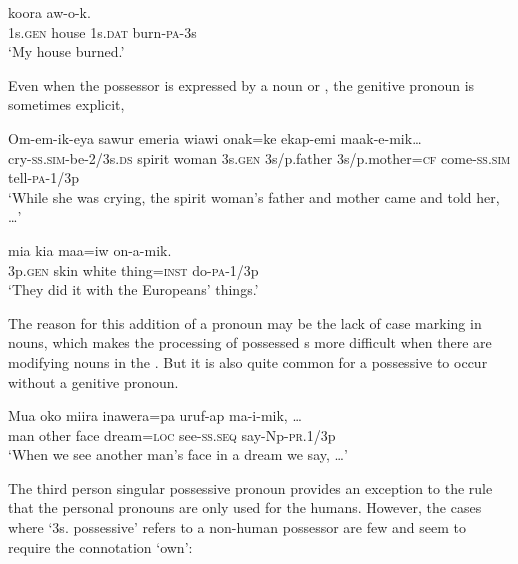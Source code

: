 \ea%
\label{ex:x570}
\gll {} koora  aw-o-k. \\
1s.\textsc{gen} house 1s.\textsc{dat} burn-\textsc{pa}-3s\\
\glt`My house burned.'
\z

Even when the possessor is expressed by a noun or , the genitive pronoun is sometimes explicit,  \textstyleParagraphContinuationChar{ (} 

\ea%
\label{ex:x573}
\gll Om-em-ik-eya sawur emeria  wiawi onak=ke ekap-emi maak-e-mik{\dots}
\\
cry-\textsc{ss}.\textsc{sim}-be-2/3s.\textsc{ds} spirit woman 3s.\textsc{gen} 3s/p.father 3s/p.mother=\textsc{cf} come-\textsc{ss}.\textsc{sim} tell-\textsc{pa}-1/3p\\
\glt`While she was crying, the spirit woman's father and mother came and told her, {\dots}'
\z

\ea%
\label{ex:x574}
\gll {} mia kia maa=iw on-a-mik. \\
3p.\textsc{gen} skin white thing=\textsc{inst} do-\textsc{pa}-1/3p\\
\glt`They did it with the Europeans' things.'
\z

The reason for this addition of a pronoun may be the lack of case marking in nouns, which makes the processing of possessed s more difficult when there are modifying nouns in the . But it is also quite common for a possessive  to occur without a genitive pronoun. 

\ea%
\label{ex:x575}
\gll Mua oko miira inawera=pa uruf-ap ma-i-mik, {\dots} \\
man other face dream=\textsc{loc} see-\textsc{ss}.\textsc{seq} say-Np-\textsc{pr}.1/3p\\
\glt`When we see another man's face in a dream we say, {\dots}'
\z

The third person singular possessive pronoun provides an exception to the rule that the personal pronouns are only used for the humans. However, the cases where  `3s. possessive' refers to a non-human possessor are few and seem to require the connotation `own':

